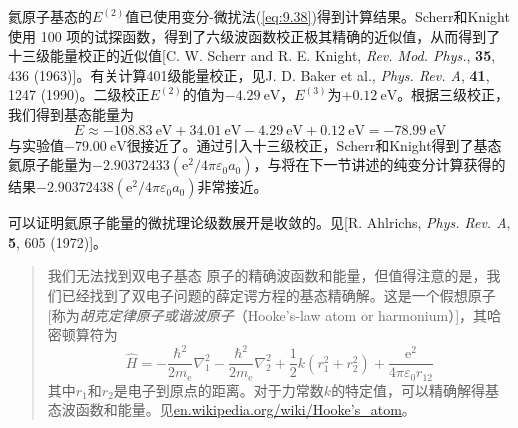     氦原子基态的$E^{\left(2\right)}$值已使用变分-微扰法(\ref{eq:9.38})得到计算结果。Scherr和Knight使用 100 项的试探函数，得到了六级波函数校正极其精确的近似值，从而得到了十三级能量校正的近似值[C. W. Scherr and R. E. Knight, \textit{Rev. Mod. Phys.}, \textbf{35}, 436 (1963)]。有关计算401级能量校正，见J. D. Baker et al., \textit{Phys. Rev. A}, \textbf{41}, 1247 (1990)。二级校正$E^{\left(2\right)}$的值为$-4.29 \: \mathrm{eV}$，$E^{\left(3\right)}$为$+0.12 \: \mathrm{eV}$。根据三级校正，我们得到基态能量为
    \begin{equation*}
        E \approx -108.83 \: \mathrm{eV} + 34.01 \: \mathrm{eV} - 4.29 \: \mathrm{eV} + 0.12 \: \mathrm{eV} = -78.99 \: \mathrm{eV}
    \end{equation*}
    与实验值$-79.00 \: \mathrm{eV}$很接近了。通过引入十三级校正，Scherr和Knight得到了基态氦原子能量为$-2.90372433 \left(\mathrm{e}^2 / 4\pi\varepsilon_0a_0\right)$，与将在下一节讲述的纯变分计算获得的结果$-2.90372438 \left(\mathrm{e}^2 / 4\pi\varepsilon_0a_0\right)$非常接近。

    可以证明氦原子能量的微扰理论级数展开是收敛的。见[R. Ahlrichs, \textit{Phys. Rev. A}, \textbf{5}, 605 (1972)]。

    \begin{quote}
        \small
        \noindent 我们无法找到双电子基态  原子的精确波函数和能量，但值得注意的是，我们已经找到了双电子问题的薛定谔方程的基态精确解。这是一个假想原子[称为\textit{胡克定律原子或谐波原子}（Hooke's-law atom or harmonium）]，其哈密顿算符为
        \begin{equation*}
            \hat{H} = -\frac{\hbar^2}{2m_{\mathrm{e}}}\nabla_1^2 - \frac{\hbar^2}{2m_{\mathrm{e}}}\nabla_2^2 + \frac{1}{2}k\left(r_1^2 + r_2^2\right) + \frac{\mathrm{e}^2}{4\pi\varepsilon_0r_{12}}
        \end{equation*}
        其中$r_1$和$r_2$是电子到原点的距离。对于力常数$k$的特定值，可以精确解得基态波函数和能量。见\url{en.wikipedia.org/wiki/Hooke’s_atom}。
    \end{quote}

